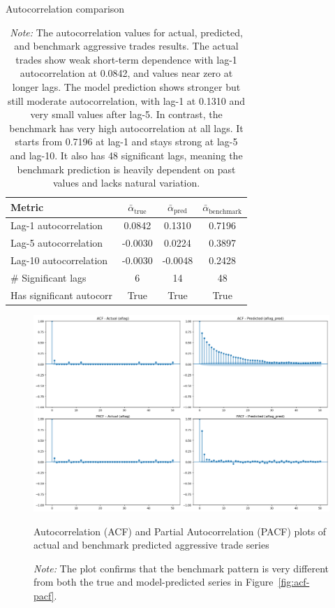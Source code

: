 \begin{table}[tbp]
\centering
\caption{Autocorrelation comparison}
\caption*{\textit{Note:} The autocorrelation values for actual, predicted, and benchmark aggressive trades results. The actual trades show weak short-term dependence with lag-1 autocorrelation at 0.0842, and values near zero at longer lags. The model prediction shows stronger but still moderate autocorrelation, with lag-1 at 0.1310 and very small values after lag-5. In contrast, the benchmark has very high autocorrelation at all lags. It starts from 0.7196 at lag-1 and stays strong at lag-5 and lag-10. It also has 48 significant lags, meaning the benchmark prediction is heavily dependent on past values and lacks natural variation.}

\begin{tabular}{lccc}
\toprule
\textbf{Metric} & $\bar{\alpha}_{\text{true}}$ & $\bar{\alpha}_{\text{pred}}$ & $\bar{\alpha}_{\text{benchmark}}$ \\
\midrule
Lag-1 autocorrelation       & 0.0842  & 0.1310  & 0.7196  \\
Lag-5 autocorrelation       & -0.0030 & 0.0224  & 0.3897  \\
Lag-10 autocorrelation      & -0.0030 & -0.0048 & 0.2428  \\
\# Significant lags         & 6       & 14      & 48      \\
Has significant autocorr    & True    & True    & True    \\
\bottomrule
\end{tabular}
\label{tab:acf-series-com}
\end{table}


\begin{figure}[tbp]
    \centering
    \includegraphics[width=0.95\linewidth]{figures/ACF_181330_benchmark.png}
    \caption{Autocorrelation (ACF) and Partial Autocorrelation (PACF) plots of actual and benchmark predicted aggressive trade series}
    \caption*{\textit{Note:} The plot confirms that the benchmark pattern is very different from both the true and model-predicted series in Figure~\ref{fig:acf-pacf}.}
    \label{fig:acf-pacf-com}
\end{figure}

